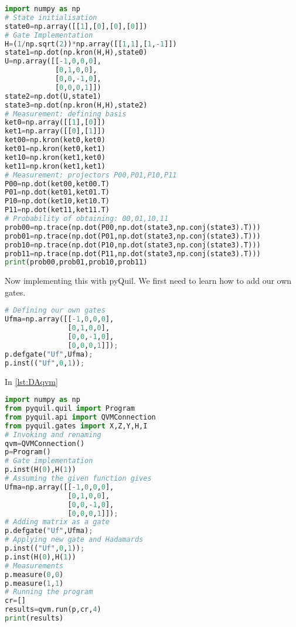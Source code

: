 \begin{lstlisting}[language=Python,caption={Deutsch's algorithm implemented in Python only},label={lst:DApython},frame=single] 
import numpy as np
# State initialisation
state0=np.array([[1],[0],[0],[0]]) 
# Gate Implementation
H=(1/np.sqrt(2))*np.array([[1,1],[1,-1]]) 
state1=np.dot(np.kron(H,H),state0)        
U=np.array([[-1,0,0,0],
            [0,1,0,0],
            [0,0,-1,0],
            [0,0,0,1]])
state2=np.dot(U,state1)
state3=np.dot(np.kron(H,H),state2)
# Measurement: defining basis
ket0=np.array([[1],[0]])
ket1=np.array([[0],[1]])
ket00=np.kron(ket0,ket0)
ket01=np.kron(ket0,ket1)
ket10=np.kron(ket1,ket0)
ket11=np.kron(ket1,ket1)
# Measurement: projectors P00,P01,P10,P11
P00=np.dot(ket00,ket00.T)
P01=np.dot(ket01,ket01.T)
P10=np.dot(ket10,ket10.T)
P11=np.dot(ket11,ket11.T)
# Probability of obtaining: 00,01,10,11
prob00=np.trace(np.dot(P00,np.dot(state3,np.conj(state3).T)))
prob01=np.trace(np.dot(P01,np.dot(state3,np.conj(state3).T)))
prob10=np.trace(np.dot(P10,np.dot(state3,np.conj(state3).T)))
prob11=np.trace(np.dot(P11,np.dot(state3,np.conj(state3).T)))
print(prob00,prob01,prob10,prob11)
\end{lstlisting}

Now implementing this with pyQuil. We first need to learn how to add our own gates.

\begin{lstlisting}[language=Python]
# Defining our own gates
Ufma=np.array([[-1,0,0,0],
               [0,1,0,0],
               [0,0,-1,0],
               [0,0,0,1]]); 
p.defgate("Uf",Ufma); 
p.inst(("Uf",0,1)); 
\end{lstlisting}

In \autoref{lst:DAqvm}

\begin{lstlisting}[language=Python,caption={Deutsch's algorithm with pyQuil},label={lst:DAqvm},frame=single]
import numpy as np
from pyquil.quil import Program
from pyquil.api import QVMConnection 
from pyquil.gates import X,Z,Y,H,I 
# Invoking and renaming
qvm=QVMConnection()
p=Program() 
# Gate implementation
p.inst(H(0),H(1)) 
# Assuming the given function gives
Ufma=np.array([[-1,0,0,0],
               [0,1,0,0],
               [0,0,-1,0],
               [0,0,0,1]]);
# Adding matrix as a gate               
p.defgate("Uf",Ufma); 
# Applying new gate and Hadamards
p.inst(("Uf",0,1)); 
p.inst(H(0),H(1))
# Measurements
p.measure(0,0)
p.measure(1,1) 
# Running the program
cr=[] 
results=qvm.run(p,cr,4) 
print(results)
\end{lstlisting}

